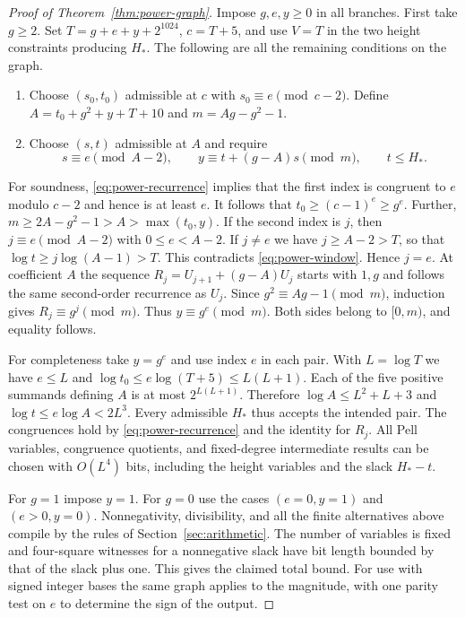 \documentclass[11pt,letterpaper]{article}
\numberwithin{equation}{section}
\begin{document}
\begin{proof}[Proof of Theorem~\ref{thm:power-graph}]
Impose $g,e,y\ge0$ in all branches. First take $g\ge2$. Set
$T=g+e+y+2^{1024}$, $c=T+5$, and use $V=T$ in the two height
constraints producing $H_*$. The following are all the remaining
conditions on the graph.
\begin{enumerate}
\item Choose $(s_0,t_0)$ admissible at $c$ with
      $s_0\equiv e\pmod{c-2}$. Define
      $A=t_0+g^2+y+T+10$ and $m=Ag-g^2-1$.
\item Choose $(s,t)$ admissible at $A$ and require
\[
   s\equiv e\pmod{A-2},\qquad
   y\equiv t+(g-A)s\pmod m,\qquad t\le H_* .
\]
\end{enumerate}

For soundness, \eqref{eq:power-recurrence} implies that the first
index is congruent to $e$ modulo $c-2$ and hence is at least $e$.
It follows that $t_0\ge(c-1)^e\ge g^e$. Further,
$m\ge2A-g^2-1>A>\max(t_0,y)$.
If the second index is $j$, then $j\equiv e\pmod{A-2}$ with
$0\le e<A-2$. If $j\ne e$ we have $j\ge A-2>T$, so that
$\log t\ge j\log(A-1)>T$. This contradicts \eqref{eq:power-window}.
Hence $j=e$. At coefficient $A$ the sequence
$R_j=U_{j+1}+(g-A)U_j$ starts with $1,g$ and follows the same
second-order recurrence as $U_j$. Since $g^2\equiv Ag-1\pmod m$,
induction gives $R_j\equiv g^j\pmod m$. Thus $y\equiv g^e\pmod m$.
Both sides belong to $[0,m)$, and equality follows.

For completeness take $y=g^e$ and use index $e$ in each pair.
With $L=\log T$ we have $e\le L$ and
$\log t_0\le e\log(T+5)\le L(L+1)$. Each of the five positive
summands defining $A$ is at most $2^{L(L+1)}$. Therefore
$\log A\le L^2+L+3$ and $\log t\le e\log A<2L^3$.
Every admissible $H_*$ thus accepts the intended pair. The congruences
hold by \eqref{eq:power-recurrence} and the identity for $R_j$.
All Pell variables, congruence quotients, and fixed-degree
intermediate results can be chosen with $O(L^4)$ bits, including the
height variables and the slack $H_*-t$.

For $g=1$ impose $y=1$. For $g=0$ use the cases $(e=0,y=1)$ and
$(e>0,y=0)$. Nonnegativity, divisibility, and all the finite
alternatives above compile by the rules of Section~\ref{sec:arithmetic}.
The number of variables is fixed and four-square witnesses for a
nonnegative slack have bit length bounded by that of the slack plus one.
This gives the claimed total bound. For use with signed integer bases
the same graph applies to the magnitude, with one parity test on $e$
to determine the sign of the output.
\end{proof}
\end{document}
